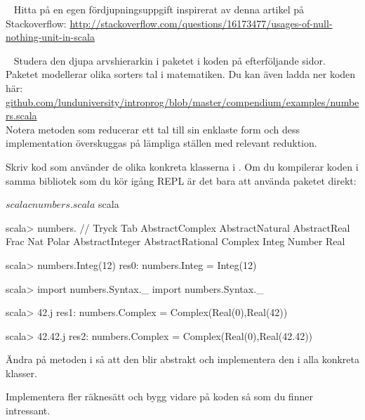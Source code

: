 
\QUESTBEGIN

\Task  \what~ Hitta på en egen fördjupningsuppgift inspirerat av denna artikel på Stackoverflow: \url{http://stackoverflow.com/questions/16173477/usages-of-null-nothing-unit-in-scala}

\SOLUTION


\QUESTEND







\QUESTBEGIN

\Task  \what~ Studera den djupa arvshierarkin i paketet  i koden på efterföljande sidor. Paketet  modellerar olika sorters tal i matematiken. Du kan även ladda ner koden här: \\
\href{https://github.com/lunduniversity/introprog/blob/master/compendium/examples/numbers.scala}{github.com/lunduniversity/introprog/blob/master/compendium/examples/numbers.scala}
\\ Notera metoden  som reducerar ett tal till sin enklaste form och dess implementation överskuggas på lämpliga ställen med relevant reduktion.

\Subtask Skriv kod som använder de olika konkreta klasserna i . Om du kompilerar koden i samma bibliotek som du kör igång REPL är det bara att använda paketet direkt:
\begin{REPL}
$ scalac numbers.scala
$ scala

scala> numbers.  // Tryck Tab
AbstractComplex   AbstractNatural    AbstractReal   Frac    Nat      Polar
AbstractInteger   AbstractRational   Complex        Integ   Number   Real

scala> numbers.Integ(12)
res0: numbers.Integ = Integ(12)

scala> import numbers.Syntax._
import numbers.Syntax._

scala> 42.j
res1: numbers.Complex = Complex(Real(0),Real(42))

scala> 42.42.j
res2: numbers.Complex = Complex(Real(0),Real(42.42))

\end{REPL}

\Subtask Ändra på metoden \code{+} i  så att den blir abstrakt och implementera den i alla konkreta klasser.

\Subtask Implementera fler räknesätt och bygg vidare på koden så som du finner intressant.

